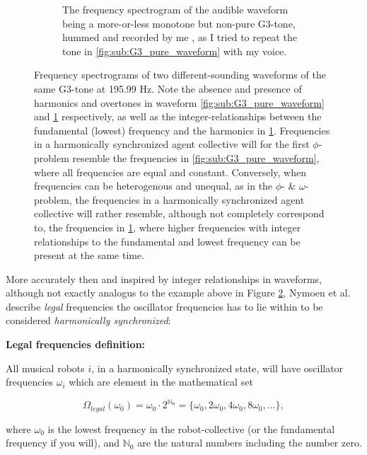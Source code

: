 \begin{figure}[ht!]
\begin{subfigure}[t]{.5\textwidth}
		\caption{The frequency spectrogram of the audible waveform being a more-or-less monotone but non-pure G3-tone, hummed and recorded by me \cite{}, as I tried to repeat the tone in \ref{fig:sub:G3_pure_waveform} with my voice.}
		\label{fig:sub:G3_hummed_waveform}
	\end{subfigure}
	\caption[Frequency spectrograms illustrating the absence and presence of harmonics and overtones in audible waveforms]{Frequency spectrograms of two different-sounding waveforms of the same G3-tone at 195.99 Hz. Note the absence and presence of harmonics and overtones in waveform \ref{fig:sub:G3_pure_waveform} and \ref{fig:sub:G3_hummed_waveform} respectively, as well as the integer-relationships between the fundamental (lowest) frequency and the harmonics in \ref{fig:sub:G3_hummed_waveform}. Frequencies in a harmonically synchronized agent collective will for the first $\phi$-problem resemble the frequencies in \ref{fig:sub:G3_pure_waveform}, where all frequencies are equal and constant. Conversely, when frequencies can be heterogenous and unequal, as in the $\phi$- \& $\omega$-problem, the frequencies in a harmonically synchronized agent collective will rather resemble, although not completely correspond to, the frequencies in \ref{fig:sub:G3_hummed_waveform}, where higher frequencies with integer relationships to the fundamental and lowest frequency can be present at the same time.}
	\label{fig:frequency_spectrograms}
\end{figure}

More accurately then and inspired by integer relationships in waveforms, although not exactly analogus to the example above in Figure \ref{fig:frequency_spectrograms}, Nymoen et al. describe \textit{legal} frequencies the oscillator frequencies has to lie within to be considered \textit{harmonically synchronized}: \nl

\textbf{Legal frequencies definition:} \nl

All musical robots $i$, in a harmonically synchronized state, will have oscillator frequencies $\omega_i$ which are element in the mathematical set

\begin{equation}\label{legal_freqs}
\Omega_{legal}(\omega_0) = \omega_{0} \cdot 2^{\mathbb{N}_0} = \{\omega_{0}, 2\omega_{0}, 4\omega_{0}, 8\omega_{0}, ...\} ,
\end{equation}

where $\omega_{0}$ is the lowest frequency in the robot-collective (or the fundamental frequency if you will), and $\mathbb{N}_0$ are the natural numbers including the number zero. \nl

